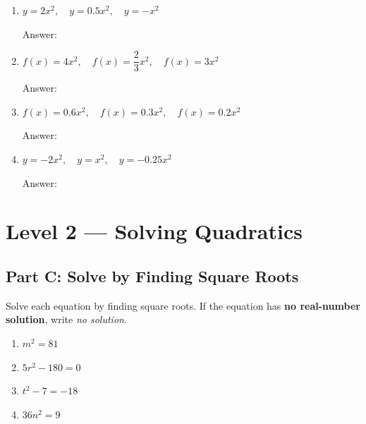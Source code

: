 \documentclass[12pt]{article}
\newcommand{\blank}{\underline{\hspace{2.5cm}}}
\begin{document}
\begin{enumerate}[leftmargin=*, label=\textbf{\arabic*.}, start=6]

  \item $y = 2x^2, \quad y = 0.5x^2, \quad y = -x^2$

  \vspace{1cm}
  Answer: \blank

  \item $f(x) = 4x^2, \quad f(x) = \dfrac{2}{3}x^2, \quad f(x) = 3x^2$

  \vspace{1cm}
  Answer: \blank

  \item $f(x) = 0.6x^2, \quad f(x) = 0.3x^2, \quad f(x) = 0.2x^2$

  \vspace{1cm}
  Answer: \blank

  \item $y = -2x^2, \quad y = x^2, \quad y = -0.25x^2$

  \vspace{1cm}
  Answer: \blank

\end{enumerate}

\section*{\textcolor{orange1}{Level 2 — Solving Quadratics}}

\subsection*{Part C: Solve by Finding Square Roots}

\noindent Solve each equation by finding square roots. If the equation has \textbf{no real-number solution}, write \textit{no solution}.

\begin{enumerate}[leftmargin=*, label=\textbf{\arabic*.}, start=10]

  \item $m^2 = 81$

  \vspace{2.2cm}

  \item $5r^2 - 180 = 0$

  \vspace{2.2cm}

  \item $t^2 - 7 = -18$

  \vspace{2.2cm}

  \item $36n^2 = 9$

  \vspace{2.2cm}

\end{enumerate}
\end{document}
